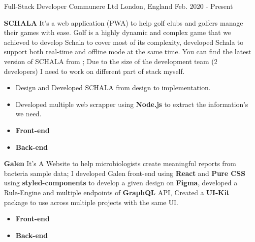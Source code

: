 \begin{cventries}
  \cventry
    {Full-Stack Developer} %
    {Communere Ltd } %
    {London, England} %
    {Feb. 2020 - Present} %
    {
        \textcolor{primary}{\textbf{SCHALA}}\break
        {It’s a web application (PWA) to help golf clubs and golfers manage their games with ease. Golf is a highly dynamic and complex game that we achieved to develop Schala to cover most of its complexity, developed Schala to support both real-time and offline mode at the same time. You can find the latest version of SCHALA from ; Due to the size of the development team (2 developers) I need to work on different part of stack myself.}
        \begin{itemize}
            \item Design and Developed SCHALA from design to implementation.
            \item Developed multiple web scrapper using \textbf{Node.js} to extract the information's we need.
            \item \textbf{Front-end} 
            \item \textbf{Back-end}  
        \end{itemize}
        \textcolor{primary}{\textbf{Galen}}\break
        {It's A Website to help microbiologists create meaningful reports from bacteria sample data; I developed Galen front-end using \textbf{React} and \textbf{Pure CSS} using \textbf{styled-components} to develop a given design on \textbf{Figma}, developed a Rule-Engine and multiple endpoints of \textbf{GraphQL} API, Created a \textbf{UI-Kit} package to use across multiple projects with the same UI.}
        \begin{itemize}
        \item \textbf{Front-end} 
            \item \textbf{Back-end}  
        \end{itemize}
}
\end{cventries}
